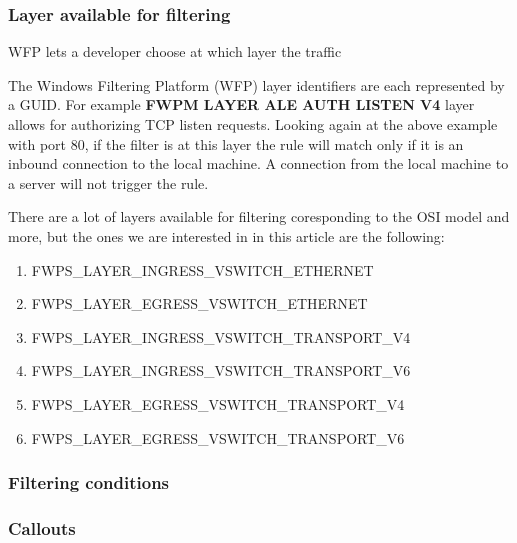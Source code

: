 \vspace{5mm}

\subsubsection{Layer available for filtering}

\vspace{5mm}

WFP lets a developer choose at which layer the traffic

\vspace{5mm}

The Windows Filtering Platform (WFP) layer identifiers are each represented by a GUID.
For example \textbf{FWPM LAYER ALE AUTH LISTEN V4} layer allows for authorizing TCP listen requests. Looking again at the above example with port 80, if the filter is at this layer the rule will match only if it is an inbound connection to the local machine. A connection from the local machine to a server will not trigger the rule. 

\vspace{5mm}

There are a lot of layers available for filtering coresponding to the OSI model and more, but the ones we are interested in in this article are the following: 

\vspace{5mm}

\begin{enumerate}
\item FWPS\_LAYER\_INGRESS\_VSWITCH\_ETHERNET
\item FWPS\_LAYER\_EGRESS\_VSWITCH\_ETHERNET
\item FWPS\_LAYER\_INGRESS\_VSWITCH\_TRANSPORT\_V4
\item FWPS\_LAYER\_INGRESS\_VSWITCH\_TRANSPORT\_V6
\item FWPS\_LAYER\_EGRESS\_VSWITCH\_TRANSPORT\_V4
\item FWPS\_LAYER\_EGRESS\_VSWITCH\_TRANSPORT\_V6
\end{enumerate}

\subsubsection{Filtering conditions}

\subsubsection{Callouts}

